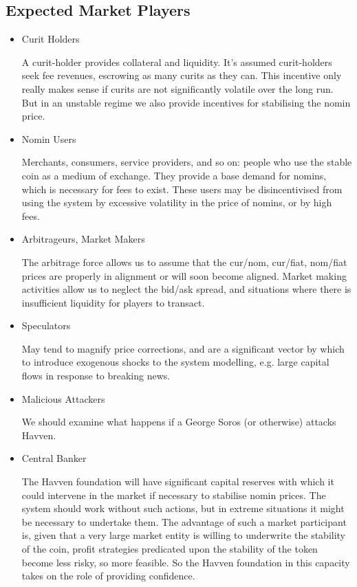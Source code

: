 \subsection{Expected Market Players}

\begin{itemize}
	\item{Curit Holders}

	A curit-holder provides collateral and liquidity. It’s assumed curit-holders seek fee revenues,
	escrowing as many curits as they can. This incentive only really makes sense if curits are not
	significantly volatile over the long run. But in an unstable regime we also provide incentives
	for stabilising the nomin price. 

	\item{Nomin Users}

	Merchants, consumers, service providers, and so on: people who use the stable coin as a
	medium of exchange. They provide a base demand for nomins, which is necessary for fees
	to exist. These users may be disincentivised from using the system by excessive volatility
	in the price of nomins, or by high fees.

	\item{Arbitrageurs, Market Makers}

	The arbitrage force allows us to assume that the cur/nom, cur/fiat, nom/fiat
	prices are properly in alignment or will soon become aligned. Market making activities
	allow us to neglect the bid/ask spread, and situations where there is insufficient
	liquidity for players to transact.
	
	\item{Speculators}
	
	May tend to magnify price corrections, and are a significant vector by which to introduce
	exogenous shocks to the system modelling, e.g. large capital flows in response to breaking news.
	
	\item{Malicious Attackers}
	
	We should examine what happens if a George Soros (or otherwise) attacks Havven.

	\item{Central Banker}
	
	The Havven foundation will have significant capital reserves with which it could intervene
	in the market if necessary to stabilise nomin prices. The system should work without
	such actions, but in extreme situations it might be necessary to undertake them.
	The advantage of such a market participant is, given that a very large market entity is
	willing to underwrite the stability of the coin, profit strategies predicated upon the
	stability of the token become less risky, so more feasible. So the Havven foundation in
	this capacity takes on the role of providing confidence.

\end{itemize}



\pagebreak